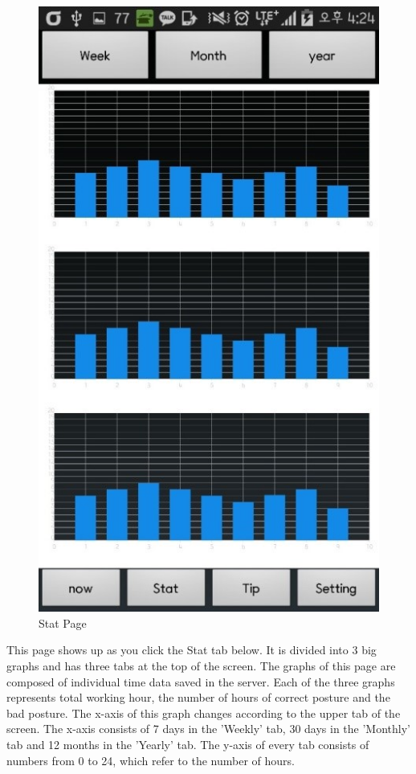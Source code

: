 \documentclass[conference]{IEEEtran}
\begin{document}
\begin{figure}[h]
\begin{center}
    \includegraphics[scale=1]{img_13}
    \caption{Stat Page} 
\end{center}
\end{figure}

This page shows up as you click the Stat tab below. It is divided into 3 big graphs and has three tabs at the top of the screen. The graphs of this page are composed of individual time data saved in the server. Each of the  three graphs represents total working hour, the number of hours of correct posture and the bad posture.
The x-axis of this graph changes according to the upper tab of the screen. The x-axis consists of 7 days in the 'Weekly' tab, 30 days in the 'Monthly' tab and 12 months in the 'Yearly' tab.
The y-axis of every tab consists of numbers from 0 to 24, which refer to the number of hours.
\end{document}
